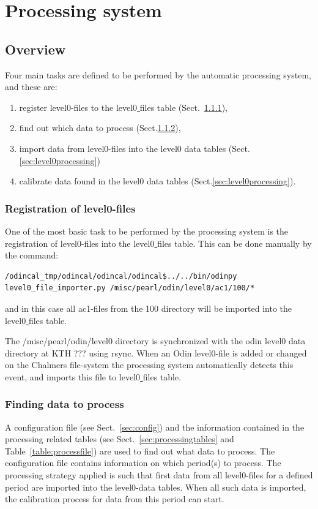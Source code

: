 \documentclass[12pt]{article}
\begin{document}

\section{Processing system}
\subsection{Overview}
Four main tasks are defined to be performed by the 
automatic processing system, 
and these are:
\begin{enumerate}
\item register level0-files to the level0\underline{ }files table
(Sect.~\ref{sec:registration}),
\item find out which data to process (Sect.\ref{sec:findingdata}),
\item import data from level0-files into the level0 data tables
(Sect.\ref{sec:level0processing})
\item calibrate data found in the level0 data tables
(Sect.\ref{sec:level0processing}).
\end{enumerate}



\subsubsection{Registration of level0-files}
\label{sec:registration}
One of the most basic task to be performed by the processing system is the
registration of level0-files into the level0\underline{ }files table.
This can be done manually by the command:
\begin{verbatim}
/odincal_tmp/odincal/odincal/odincal$../../bin/odinpy 
level0_file_importer.py /misc/pearl/odin/level0/ac1/100/*
\end{verbatim}
and in this case all ac1-files from the 100 directory will be imported
into the level0\underline{ }files table. 

The /misc/pearl/odin/level0 directory
is synchronized with the odin level0 data directory at KTH ??? using rsync. 
When an Odin level0-file is added or changed on the Chalmers file-system
the processing system automatically detects this event, and imports this
file to level0\underline{ }files table.


\subsubsection{Finding data to process}
\label{sec:findingdata}
A configuration file (see Sect.~\ref{sec:config})
and the information contained 
in the processing related tables (see Sect.~\ref{sec:processingtables}
and Table~\ref{table:processfile}) 
are used to find out what data to process. 
The configuration file contains information on which period(s)
to process. The processing strategy applied is such that
first data from all level0-files for a defined period
are imported into the level0-data tables.
When all such data is imported, the calibration process
for data from this period can start.
\end{document}
